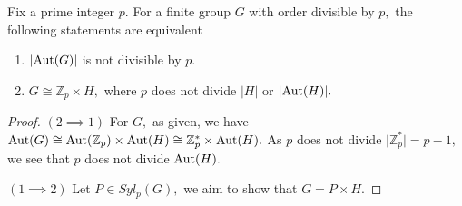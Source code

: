 \begin{corollary}
	Fix a prime integer $p.$ For a finite group $G$ with order divisible by $p,$ the following statements are equivalent
	\begin{enumerate}
		\item $ \lvert \operatorname{Aut}(G) \rvert $ is not divisible by $p.$
		\item $G \cong \mathbb{Z}_p \times H,$ where
			$p$ does not divide $ \lvert H \rvert$ or
			$ \lvert \operatorname{Aut}(H) \rvert.$
	\end{enumerate}
\end{corollary}

\begin{proof}
	$(2 \implies 1)	$ For $G,$ as given, we have
	$ \operatorname{Aut}(G) \cong \operatorname{Aut}(\mathbb{Z}_p) \times \operatorname{Aut}(H)
	\cong \mathbb{Z}_p^\ast \times \operatorname{Aut}(H).$
	As $p$ does not divide $ \lvert \mathbb{Z}_p^\ast \rvert = p-1,$
	we see that $p$ does not divide $ \operatorname{Aut}(H).$

	$ (1 \implies 2) $ Let $P \in Syl_p(G),$ we aim to show that $G = 
	P \times  H.$
\end{proof}

